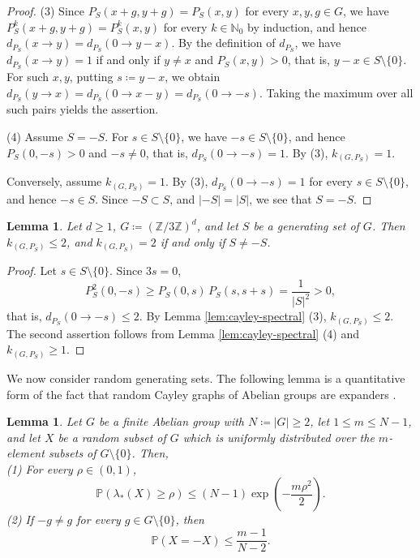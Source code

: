 \documentclass[a4paper, reqno, 11pt]{amsart}
\newtheorem{Lem}[Thm]{Lemma}
\theoremstyle{definition}
\begin{document}
\begin{proof}
(3)
Since $P_{S}(x+g, y+g) = P_{S}(x,y)$ for every $x, y, g \in G$, we have $P_{S}^{k}(x+g, y+g) = P_{S}^{k}(x,y)$ for every $k \in \mathbb{N}_{0}$ by induction,
and hence $d_{P_{S}}(x \to y) = d_{P_{S}}(0 \to y - x)$.
By the definition of $d_{P_{S}}$, we have $d_{P_{S}}(x \to y) = 1$ if and only if $y \ne x$ and $P_{S}(x,y) > 0$, that is, $y - x \in S \setminus \{0\}$.
For such $x, y$, putting $s \coloneqq y - x$, we obtain $d_{P_{S}}(y \to x) = d_{P_{S}}(0 \to x - y) = d_{P_{S}}(0 \to -s)$.
Taking the maximum over all such pairs yields the assertion.

(4)
Assume $S = -S$. 
For $s \in S \setminus \{0\}$, we have $-s \in S \setminus \{0\}$, and hence $P_{S}(0, -s) > 0$ and $-s \ne 0$, that is, $d_{P_{S}}(0 \to -s) = 1$.
By (3), $k_{(G, P_{S})} = 1$.

Conversely, assume $k_{(G, P_{S})} = 1$. 
By (3), $d_{P_{S}}(0 \to -s) = 1$ for every $s \in S \setminus \{0\}$, and hence $-s \in S$.
Since $-S \subset S$, and $|-S| = |S|$, we see that $S = -S$.
\end{proof}

\begin{Lem}\label{lem:k-exponent-3}
Let $d \ge 1$, $G \coloneqq (\mathbb{Z}/3\mathbb{Z})^{d}$, and let $S$ be a generating set of $G$.
Then $k_{(G, P_{S})} \le 2$, and $k_{(G, P_{S})} = 2$ if and only if $S \ne -S$.
\end{Lem}

\begin{proof}
Let $s \in S \setminus \{0\}$. 
Since $3s = 0$, 
\[ P_{S}^{2}(0, -s) \ge P_{S}(0, s)\, P_{S}(s, s+s) = \frac{1}{|S|^{2}} > 0, \]
that is, $d_{P_{S}}(0 \to -s) \le 2$. 
By Lemma \ref{lem:cayley-spectral} (3), $k_{(G, P_{S})} \le 2$.
The second assertion follows from Lemma \ref{lem:cayley-spectral} (4) and $k_{(G, P_{S})} \ge 1$.
\end{proof}



We now consider random generating sets. The following lemma is a quantitative form of the fact that random Cayley graphs of Abelian groups are expanders \cite{AR1994}.

\begin{Lem}\label{lem:random-subset}
Let $G$ be a finite Abelian group with $N \coloneqq |G| \ge 2$, let $1 \le m \le N-1$,
and let $X$ be a random subset of $G$ which is uniformly distributed over the $m$-element subsets of $G \setminus \{0\}$.
Then, \\
(1) For every $\rho \in (0,1)$,
\[ \mathbb{P}\left(\lambda_{*}(X) \ge \rho\right) \le (N-1) \exp\left(-\frac{m \rho^{2}}{2}\right). \]
(2) If $-g \ne g$ for every $g \in G \setminus \{0\}$, then
\[ \mathbb{P}\left(X = -X\right) \le \frac{m-1}{N-2}. \]
\end{Lem}
\end{document}
